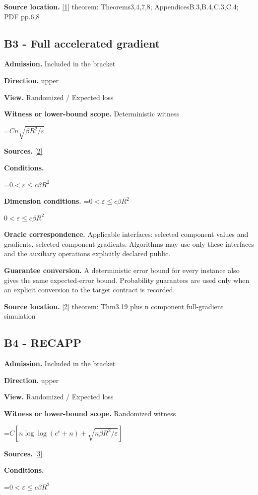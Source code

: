 \documentclass[10pt,a4paper]{article}
\newcommand{\AtlasMath}[1]{\par\begingroup\centering\setbox0=\hbox{$\displaystyle #1$}\ifdim\wd0>1.4\linewidth\typeout{ATLAS WIDE FORMULA: \the\wd0}\fi\ifdim\wd0>\linewidth\resizebox{\linewidth}{!}{\box0}\else\box0\fi\par\endgroup}
\newcommand{\AtlasInlineMath}[1]{\begingroup\setbox0=\hbox{$#1$}\ifdim\wd0>.4\linewidth\endgroup\AtlasMath{#1}\else\endgroup$#1$\fi}
\begin{document}
\textbf{Source location.} \href{https://arxiv.org/pdf/1605.08003v3}{[1]} theorem: Theorems3,4,7,8; AppendicesB.3,B.4,C.3,C.4; PDF pp.6,8

\subsection{B3 - Full accelerated gradient}
\textbf{Admission.} Included in the bracket

\textbf{Direction.} upper

\textbf{View.} Randomized / Expected loss

\textbf{Witness or lower-bound scope.} Deterministic witness

\AtlasMath{Cn\sqrt{\beta R^2/\varepsilon}}
\textbf{Sources.} \href{https://arxiv.org/pdf/1405.4980}{[2]}

\textbf{Conditions.} 
\AtlasMath{0<\varepsilon\le c\beta R^2}


\textbf{Dimension conditions.} \AtlasInlineMath{0<\varepsilon\le c\beta R^2}

\textbf{Oracle correspondence.} Applicable interfaces: selected component values and gradients, selected component gradients. Algorithms may use only these interfaces and the auxiliary operations explicitly declared public.

\textbf{Guarantee conversion.} A deterministic error bound for every instance also gives the same expected-error bound. Probability guarantees are used only when an explicit conversion to the target contract is recorded.

\textbf{Source location.} \href{https://arxiv.org/pdf/1405.4980}{[2]} theorem: Thm3.19 plus n component full-gradient simulation

\subsection{B4 - RECAPP}
\textbf{Admission.} Included in the bracket

\textbf{Direction.} upper

\textbf{View.} Randomized / Expected loss

\textbf{Witness or lower-bound scope.} Randomized witness

\AtlasMath{C[n\log\log(e^e+n)+\sqrt{n\beta R^2/\varepsilon}]}
\textbf{Sources.} \href{https://proceedings.mlr.press/v162/carmon22a/carmon22a.pdf}{[3]}

\textbf{Conditions.} 
\AtlasMath{0<\varepsilon\le c\beta R^2}
\end{document}
